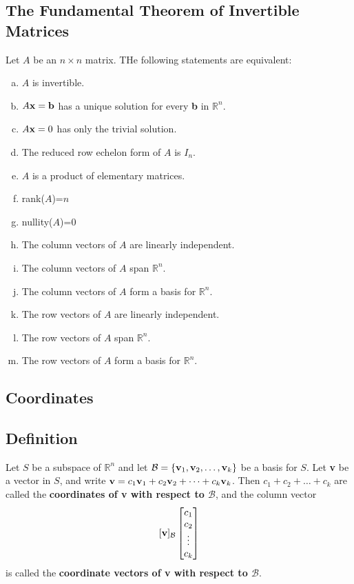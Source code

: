 \subsection*{The Fundamental Theorem of Invertible Matrices}
Let $A$ be an $n\times n$ matrix. THe following statements are equivalent:
\begin{enumerate}[(a)]
    \item $A$ is invertible.
    \item $A\mathbf{x}=\mathbf{b}$ has a unique solution for every \textbf{b} in $\mathbb{R}^n$.
    \item $A\mathbf{x}=0$ has only the trivial solution.
    \item The reduced row echelon form of $A$ is $I_n$.
    \item $A$ is a product of elementary matrices.
    \item rank($A$)=$n$
    \item nullity($A$)=0
    \item The column vectors of $A$ are linearly independent.
    \item The column vectors of $A$ span $\mathbb{R}^n$.
    \item The column vectors of $A$ form a basis for $\mathbb{R}^n$.
    \item The row vectors of $A$ are linearly independent.
    \item The row vectors of $A$ span $\mathbb{R}^n$.
    \item The row vectors of $A$ form a basis for $\mathbb{R}^n$.
\end{enumerate}

\subsection*{Coordinates}

\subsection*{Definition}
Let $S$ be a subspace of $\mathbb{R}^n$ and let $\mathcal{B}=\left\{\mathbf{v}_1,\mathbf{v}_2,\dots,\mathbf{v}_k\right\}$
be a basis for $S$. Let \textbf{v} be a vector in $S$, and write
$\mathbf{v}=c_1\mathbf{v}_1+c_2\mathbf{v}_2+\dots+c_k\mathbf{v}_k$. Then $c_1+c_2+\dots+c_k$ are called the
\textbf{coordinates of v with respect to $\mathcal{B}$}, and the column vector
\[
    [\mathbf{v}]_{\mathcal{B}}\begin{bmatrix}
        c_1 \\c_2\\ \vdots\\c_k
    \end{bmatrix}
\]
is called the \textbf{coordinate vectors of v with respect to $\mathcal{B}$}.

